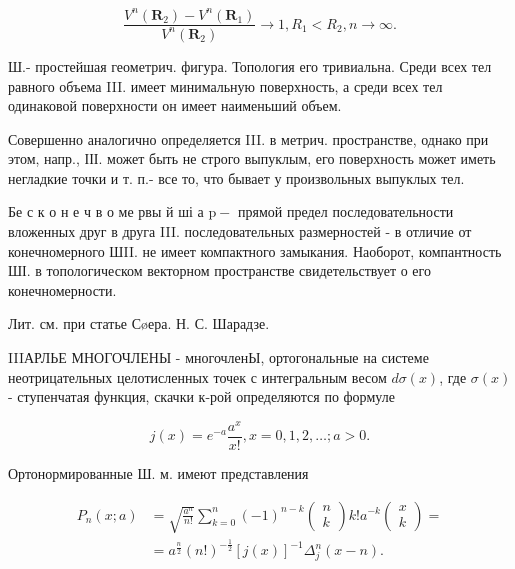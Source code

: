 \documentclass[10pt]{article}
\begin{document}
\[

\frac{V^{n}\left(\boldsymbol{R}_{2}\right)-V^{n}\left(\boldsymbol{R}_{1}\right)}{V^{n}\left(\boldsymbol{R}_{2}\right)} \longrightarrow 1, R_{1}<R_{2}, n \longrightarrow \infty .

\]



Ш.- простейшая геометрич. фигура. Топология его тривиальна. Среди всех тел равного объема III. имеет минимальную поверхность, а среди всех тел одинаковой поверхности он имеет наименьший объем.



Совершенно аналогично определяется III. в метрич. пространстве, однако при этом, напр., ІІІ. может быть не строго выпуклым, его поверхность может иметь негладкие точки и т. п.- все то, что бывает у произвольных выпуклых тел.



Бе с к о н е ч в о ме рвы й ші а $\mathrm{p}-$ прямой предел последовательности вложенных друг в друга III. последовательных размерностей - в отличие от конечномерного ШII. не имеет компактного замыкания. Наоборот, компантность ШІ. в топологическом векторном пространстве свидетельствует о его конечномерности.



Лит. см. при статье Сøера. Н. С. Шарадзе.



IIIАРЛЬЕ МНОГОЧЛЕНЫ - многочленЫ, ортогональные на системе неотрицательных целотисленных точек с интегральным весом $d \sigma(x)$, где $\sigma(x)$ - ступенчатая функция, скачки к-рой определяются по формуле



\[

j(x)=e^{-a} \frac{a^{x}}{x !}, x=0,1,2, \ldots ; a>0 .

\]



Ортонормированные Ш. м. имеют представления



\[

\begin{aligned}

P_{n}(x ; a) & =\sqrt{\frac{a^{n}}{n !}} \sum_{k=0}^{n}(-1)^{n-k}\left(\begin{array}{l}

n \\

k

\end{array}\right) k ! a^{-k}\left(\begin{array}{l}

x \\

k

\end{array}\right)= \\

& =a^{\frac{n}{2}}(n !)^{-\frac{1}{2}}[j(x)]^{-1} \Delta_{j}^{n}(x-n) .

\end{aligned}

\]
\end{document}
